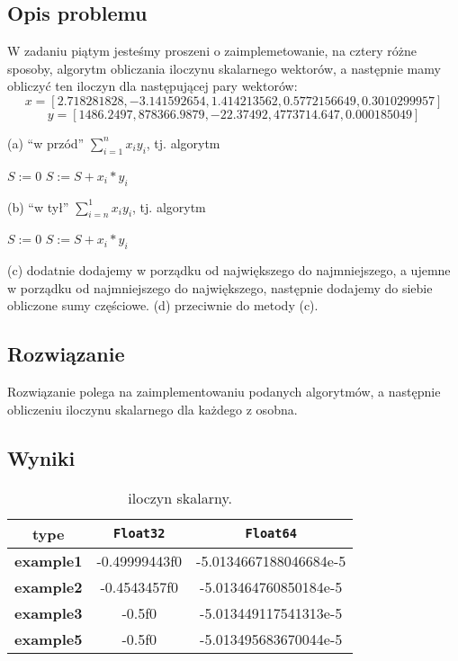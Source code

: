 \documentclass{article}
\begin{document}
\begin{center}
    \subsection{Opis problemu}
    \large W zadaniu piątym jesteśmy proszeni o zaimplemetowanie, na cztery różne sposoby, algorytm obliczania iloczynu skalarnego 
     wektorów, a następnie mamy obliczyć ten iloczyn dla następującej pary wektorów:
     \[\displaystyle x = [2.718281828, -3.141592654, 1.414213562, 0.5772156649, 0.3010299957]\]
     \[\displaystyle y = [1486.2497, 878366.9879, -22.37492, 4773714.647, 0.000185049]\]
     \begin{flushleft}
        \vspace*{1cm}
        (a) ``w przód'' \(\textstyle \sum_{i=1}^n x_{i}y_{i}\), tj. algorytm
        \begin{algorithmic}
        \State$S:=0$
            \State $S:=S+x_{i}*y_{i}$
        \EndFor
        \end{algorithmic}
        \vspace*{1cm}
        (b) ``w tył'' \(\textstyle \sum_{i=n}^1 x_{i}y_{i}\), tj. algorytm
        \begin{algorithmic}
            \State$S:=0$
                \State $S:=S+x_{i}*y_{i}$
            \EndFor
            \end{algorithmic}
        \vspace*{1cm}
        (c) dodatnie dodajemy w porządku od największego do najmniejszego, a ujemne w porządku od najmniejszego do największego,
        następnie dodajemy do siebie obliczone sumy częściowe.\newline
        (d) przeciwnie do metody (c). \newpage
     \end{flushleft}
    \subsection{Rozwiązanie}
    \large Rozwiązanie polega na zaimplementowaniu podanych algorytmów, a następnie obliczeniu iloczynu skalarnego dla każdego z osobna.
    \subsection{Wyniki}

    \begin{table}[h!]
    \centering
    \begin{tabular}{||c c c||} 
    \hline
    \textbf{type} & \texttt{Float32} & \texttt{Float64} \\ [0.5ex]
    \hline\hline
    \textbf{example1} & -0.49999443f0 & -5.0134667188046684e-5 \\ 
    \textbf{example2} & -0.4543457f0 & -5.013464760850184e-5 \\ 
    \textbf{example3} & -0.5f0 & -5.013449117541313e-5 \\ 
    \textbf{example5} & -0.5f0 & -5.013495683670044e-5 \\ 
    \hline
    \end{tabular}
    \caption{iloczyn skalarny.}
    \label{table:11}
    \end{table}


\end{center}
\end{document}
